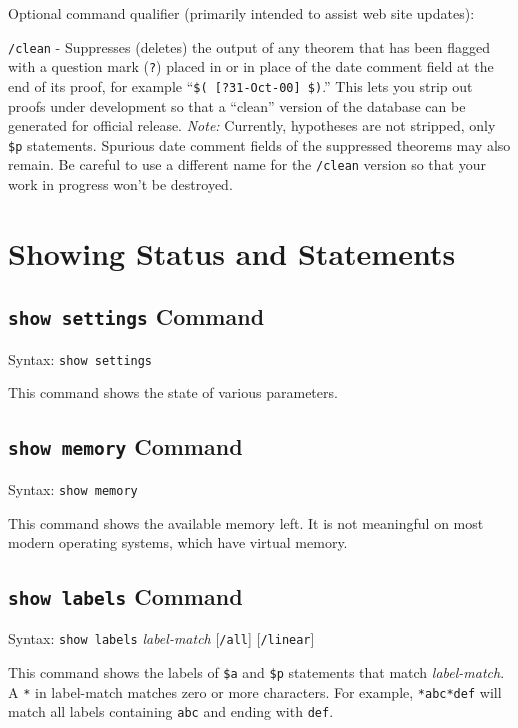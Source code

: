 Optional command qualifier (primarily intended to assist web site updates):

    \texttt{/clean} - Suppresses (deletes) the output of any theorem that
        has been flagged
        with a question mark (\texttt{?}) placed in or in place of the date
       comment field at the
        end of its proof, for example ``\texttt{\$( [?31-Oct-00] \$)}.''
        This lets
        you strip out proofs under development so that a ``clean''
        version of the database can be generated for official release.
        {\em Note:}  Currently, hypotheses are not stripped, only \texttt{\$p}
        statements.
        Spurious date comment fields of the suppressed theorems may also
        remain.  Be careful to use a different name for the \texttt{/clean}
        version so that your work in progress won't be destroyed.


\section{Showing Status and Statements}



\subsection{\texttt{show settings} Command}
Syntax:  \texttt{show settings}

This command shows the state of various parameters.

\subsection{\texttt{show memory} Command}
Syntax:  \texttt{show memory}

This command shows the available memory left.  It is not meaningful
on most modern operating systems,
which have virtual memory.


\subsection{\texttt{show labels} Command}
Syntax:  \texttt{show labels} {\em label-match} [\texttt{/all}]
   [\texttt{/linear}]

This command shows the labels of \texttt{\$a} and \texttt{\$p}
statements that match {\em label-match}.  A \verb$*$ in {label-match}
matches zero or more characters.  For example, \verb$*abc*def$ will match all
labels containing \verb$abc$ and ending with \verb$def$.

